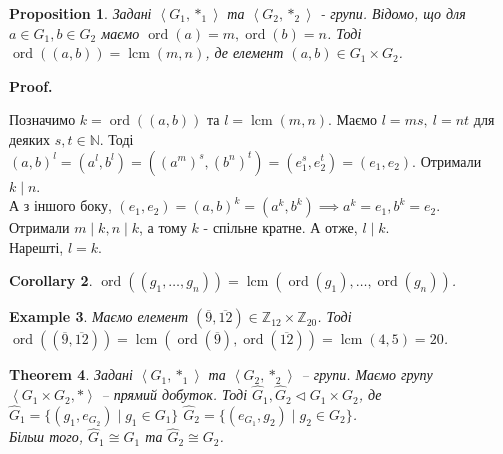 \documentclass[a4paper, 10pt]{article}
\makeatletter
\theoremstyle{theoremdd}
\newtheorem{theorem}{Theorem}[subsection]
\theoremstyle{theoremdd}
\theoremstyle{theoremdd}
\theoremstyle{theoremdd}
\theoremstyle{theoremdd}
\newtheorem{example}[theorem]{Example}
\theoremstyle{theoremdd}
\theoremstyle{theoremdd}
\theoremstyle{theoremdd}
\theoremstyle{theoremdd}
\newtheorem{proposition}[theorem]{Proposition}
\theoremstyle{theoremdd}
\theoremstyle{theoremdd}
\theoremstyle{theoremdd}
\theoremstyle{theoremdd}
\theoremstyle{theoremdd}
\newtheorem{corollary}[theorem]{Corollary}
\theoremstyle{theoremdd}
\renewenvironment{proof}[1][Proof.\\]{\par
\pushQED{\hfill \qed}%
\normalfont \topsep6\p@\@plus6\p@\relax
\trivlist
\item\relax
{\bfseries
#1\@addpunct{.}}\hspace\labelsep\ignorespaces
}{%
\popQED\endtrivlist\@endpefalse
}
\DeclareMathOperator{\ord}{ord}
\DeclareMathOperator{\lcm}{lcm}
\makeatother
\begin{document}
\begin{proposition}
Задані $\left<G_1, *_1 \right>$ та $\left<G_2, *_2 \right>$ - групи. Відомо, що для $a \in G_1, b \in G_2$ маємо $\ord(a) = m, \ord(b) = n$. Тоді $\ord((a,b)) = \lcm(m,n)$, де елемент $(a,b) \in G_1 \times G_2$.
\end{proposition}

\begin{proof}
Позначимо $k = \ord((a,b))$ та $l = \lcm(m,n)$. Маємо $l = ms,\ l = nt$ для деяких $s,t \in \mathbb{N}$. Тоді\\
$(a,b)^l = (a^l,b^l) = ((a^m)^s, (b^n)^t) = (e_1^s, e_2^t) = (e_1,e_2)$. Отримали $k \mid n$. \\
А з іншого боку, $(e_1,e_2) = (a,b)^k = (a^k,b^k) \implies a^k = e_1, b^k = e_2$.\\
Отримали $m \mid k, n \mid k$, а тому $k$ - спільне кратне. А отже, $l \mid k$.\\
Нарешті, $l = k$.
\end{proof}

\begin{corollary}
$\ord((g_1,\dots,g_n)) = \lcm(\ord(g_1), \dots, \ord(g_n))$.
\end{corollary}

\begin{example}
Маємо елемент $(\overline{9},\overline{12}) \in \mathbb{Z}_{12} \times \mathbb{Z}_{20}$. Тоді $\ord((\overline{9},\overline{12})) = \lcm(\ord(\overline{9}),\ord(\overline{12})) = \lcm(4,5) = 20$.
\end{example}

\begin{theorem}
Задані $\left< G_1, *_1 \right>$ та $\left< G_2, *_2 \right>$ -- групи. Маємо групу $\left< G_1 \times G_2, * \right>$ -- прямий добуток. Тоді $\hat{G}_1, \hat{G}_2 \triangleleft G_1 \times G_2$, де\\
$\hat{G}_1 = \{ (g_1, e_{G_2}) \mid g_1 \in G_1 \}$ \qquad $\hat{G}_2 = \{ (e_{G_1}, g_2) \mid g_2 \in G_2 \}$.\\
Більш того, $\hat{G}_1 \cong G_1$ та $\hat{G}_2 \cong G_2$.
\end{theorem}
\end{document}

